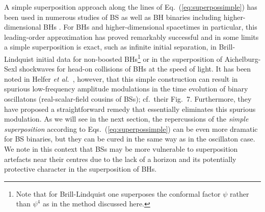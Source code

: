 \documentclass[]{iopart}
\newcommand{\us}[1]{\textcolor{teal}{[{\it\textbf{US: #1}}]} }
\renewcommand{\mr}[1]{\textcolor{purple}{[{\it\textbf{MR: #1}}]} }
\newcommand{\el}[1]{\textcolor{brown}{[{\it\textbf{EL: #1}}]} }
\begin{document}
A simple superposition approach along the lines
of Eq.~(\ref{eq:superpossimple}) has been used in
numerous studies of BS as well as BH binaries
including higher-dimensional BHs
\cite{Palenzuela:2006wp,Palenzuela:2007dm,Shibata:2008rq,Okawa:2011fv,Palenzuela:2017kcg,Sperhake:2019oaw}. For BHs and higher-dimensional
spacetimes in particular, this leading-order approximation
has proved remarkably successful and in some limits
a simple superposition is
exact, such as infinite initial separation,
in Brill-Lindquist initial data for non-boosted
\setcounter{footnote}{6}
BHs\footnote{Note that for Brill-Lindquist one superposes the conformal
factor $\psi$ rather than $\psi^4$ as in the
method discussed here.}
\cite{Brill:1963yv}
or in the superposition of
Aichelburg-Sexl shockwaves \cite{Aichelburg:1970dh}
for head-on collisions of BHs at the speed of light.
It has been noted in Helfer {\em et al.}~\cite{Helfer:2018vtq}, however,
that this simple
construction can result in spurious low-frequency
amplitude modulations in the
time evolution of binary oscillatons (real-scalar-field cousins of BSs); cf.~their Fig.~7. Furthermore, they have proposed a
straightforward remedy that essentially eliminates this spurious
modulation. As we will see in the next section, the repercussions
of the {\it simple superposition} according to Eqs.~(\ref{eq:superpossimple})
can be even more dramatic for BS binaries, but they can
be cured in the same way as in the oscillaton case.
We note in this context that BSs may be more vulnerable
to superposition artefacts near their centres
due to the lack of a horizon and
its potentially protective character in the superposition of
BHs.
\end{document}
